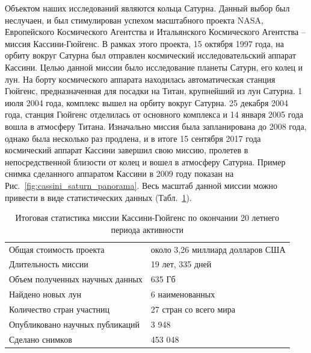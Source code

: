 Объектом наших исследований являются кольца Сатурна. 
Данный выбор был неслучаен, и был стимулирован успехом масштабного проекта NASA, Европейского Космического Агентства и Итальянского
Космического Агентства -- миссия Кассини-Гюйгенс. В рамках этого проекта, 15 октября 1997 года, на орбиту вокруг Сатурна был отправлен космический
исследовательский аппарат Кассини. Целью данной миссии было исследование планеты Сатурн, его колец и лун. На борту космического аппарата находилась
автоматическая станция Гюйгенс, предназначенная для посадки на Титан, крупнейший из лун Сатурна. 1 июля 2004 года, комплекс вышел на орбиту вокруг 
Сатурна.
25 декабря 2004 года, станция Гюйгенс отделилась от основного комплекса и 14 января 2005 года вошла в атмосферу Титана. Изначально миссия была 
запланирована до 2008 года, однако была несколько раз продлена, и в итоге 15 сентября 2017 года космический аппарат Кассини завершил свою миссию,
пролетев в непосредственной близости от колец и вошел в атмосферу Сатурна. 
Пример снимка сделанного аппаратом Кассини в 2009 году показан на Рис.~\ref{fig:cassini_saturn_panorama}.
Весь масштаб данной миссии можно привести в виде статистических данных 
(Табл.~\ref{tab:cassini_mission}). 
\begin{table}[ht]    
    \caption{Итоговая статистика миссии Кассини-Гюйгенс по окончании 20 летнего периода активности}
    \begin{tabular}{|l|l|}
    \hline    
        Общая стоимость проекта             & около 3,26 миллиард долларов США  \\
        Длительность миссии                 & 19 лет, 335 дней                  \\
        Объем полученных научных данных     & 635 Гб                            \\
        Найдено новых лун                   & 6 наименованных                   \\
        Количество стран участниц           & 27 стран со всего мира            \\
        Опубликовано научных публикаций     & 3 948                             \\
        Сделано снимков                     & 453 048                           \\
    \hline    
    \end{tabular}
    \label{tab:cassini_mission}
\end{table}

